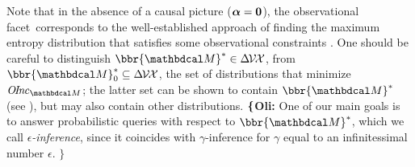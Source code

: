 \documentclass[twoside]{article}
\newcommand\obslimit{observational facet} %
\newcommand\voli[1]{{\color{olicolor}\textbf{$\boldsymbol\{$Oli: }#1 \textbf{$\boldsymbol\}$}}}
\begin{document}
Note that in the absence of a causal picture ($\boldsymbol\alpha = \mathbf{0}$), 
the \obslimit\ corresponds to the well-established approach of finding
the maximum entropy distribution that satisfies some observational constraints \parencite{jaynes1957information}.
%
One should be careful to distinguish $\bbr{\dg M}^* \in \Delta\mskip-2mu \V \mskip-2mu\X$,
from $\bbr{\dg M}^*_0 \subseteq \Delta\mskip-2mu \V \mskip-2mu\X$, the set of distributions that minimize
$\OInc_{\dg M}$; the latter set can be shown to contain $\bbr{\dg
  M}^*$ (see \cite{pdg-aaai}),
but may also contain other distributions.
%
\voli{
One of our main goals is to answer probabilistic queries with respect to $\bbr{\dg M}^*$, which we call \emph{$\epsilon$-inference}, 
since it coincides with $\gamma$-inference for $\gamma$ equal to an infinitessimal number $\epsilon$.}
\end{document}
